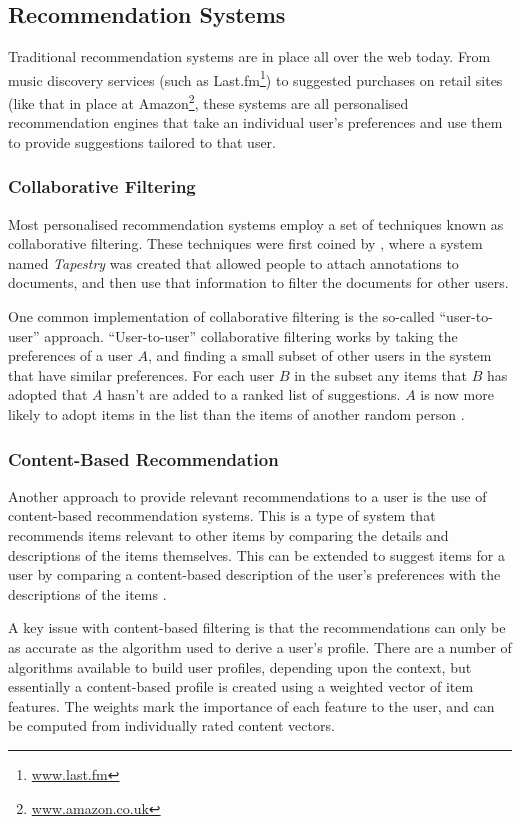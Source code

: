 \documentclass[12pt,a4paper]{article}
\begin{document}
\subsection{Recommendation Systems}
Traditional recommendation systems are in place all over the web today. From music discovery services (such as Last.fm\footnote{\url{www.last.fm}}) to suggested purchases on retail sites (like that in place at Amazon\footnote{\url{www.amazon.co.uk}}, these systems are all personalised recommendation engines that take an individual user's preferences and use them to provide suggestions tailored to that user.

\subsubsection{Collaborative Filtering}
Most personalised recommendation systems employ a set of techniques known as collaborative filtering. These techniques were first coined by \textcite{Goldberg:1992}, where a system named \emph{Tapestry} was created that allowed people to attach annotations to documents, and then use that information to filter the documents for other users.

One common implementation of collaborative filtering is the so-called ``user-to-user'' approach. ``User-to-user'' collaborative filtering works by taking the preferences of a user $A$, and finding a small subset of other users in the system that have similar preferences. For each user $B$ in the subset any items that $B$ has adopted that $A$ hasn't are added to a ranked list of suggestions. $A$ is now more likely to adopt items in the list than the items of another random person \parencite{Schafer:2001}.

\subsubsection{Content-Based Recommendation}
Another approach to provide relevant recommendations to a user is the use of content-based recommendation systems. This is a type of system that recommends items relevant to other items by comparing the details and descriptions of the items themselves. This can be extended to suggest items for a user by comparing a content-based description of the user's preferences with the descriptions of the items \parencite{Pazzani:2007}.

A key issue with content-based filtering is that the recommendations can only be as accurate as the algorithm used to derive a user's profile. There are a number of algorithms available to build user profiles, depending upon the context, but essentially a content-based profile is created using a weighted vector of item features. The weights mark the importance of each feature to the user, and can be computed from individually rated content vectors.
\end{document}
